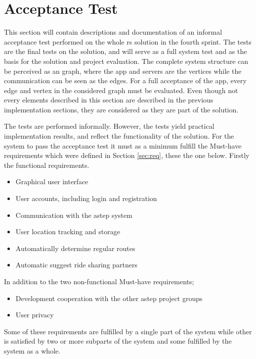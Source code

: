 \iffalse
\section{Acceptance Test}
This section will contain descriptions and documentation of an informal acceptance test performed on the whole \gls{rs} solution in the fourth sprint.
The tests are the final tests on the solution, and will serve as a full system test and as the basis for the solution and project evaluation.
The complete system structure can be perceived as an graph, where the app and servers are the vertices while the communication can be seen as the edges. 
For a full acceptance of the app, every edge and vertex in the considered graph must be evaluated. 
Even though not every elements described in this section are described in the previous implementation sections, they are considered as they are part of the solution.

The tests are performed informally. 
However, the tests yield practical implementation results, and reflect the functionality of the solution.
For the system to pass the acceptance test it must as a minimum fulfill the Must-have requirements which were defined in Section \ref{sec:req}, these the one below.
Firstly the functional requirements.
\begin{itemize}
	\item Graphical user interface
	\item User accounts, including login and registration
	\item Communication with the \gls{astep} system
	\item User location tracking and storage
	\item Automatically determine regular routes
	\item Automatic suggest ride sharing partners
\end{itemize}
In addition to the two non-functional Must-have requirements;
\begin{itemize}
	\item Development cooperation with the other \gls{astep} project groups
	\item User privacy
\end{itemize}
Some of these requirements are fulfilled by a single part of the system while other is satisfied by two or more subparts of the system and some fulfilled by the system as a whole.
